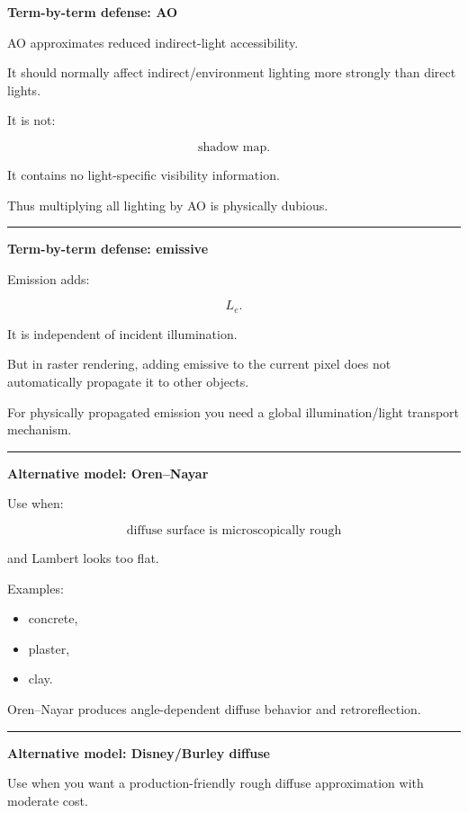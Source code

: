 \textbf{Term-by-term defense: AO}

AO approximates reduced indirect-light accessibility.

It should normally affect indirect/environment lighting more strongly than direct lights.

It is not:

\[
\text{shadow map}.
\]

It contains no light-specific visibility information.

Thus multiplying all lighting by AO is physically dubious.

\begin{center}\rule{0.5\linewidth}{0.5pt}\end{center}

\textbf{Term-by-term defense: emissive}

Emission adds:

\[
L_e.
\]

It is independent of incident illumination.

But in raster rendering, adding emissive to the current pixel does not automatically propagate it to other objects.

For physically propagated emission you need a global illumination/light transport mechanism.

\begin{center}\rule{0.5\linewidth}{0.5pt}\end{center}

\textbf{Alternative model: Oren--Nayar}

Use when:

\[
\text{diffuse surface is microscopically rough}
\]

and Lambert looks too flat.

Examples:

\begin{itemize}
\tightlist
\item
  concrete,
\item
  plaster,
\item
  clay.
\end{itemize}

Oren--Nayar produces angle-dependent diffuse behavior and retroreflection.

\begin{center}\rule{0.5\linewidth}{0.5pt}\end{center}

\textbf{Alternative model: Disney/Burley diffuse}

Use when you want a production-friendly rough diffuse approximation with moderate cost.

